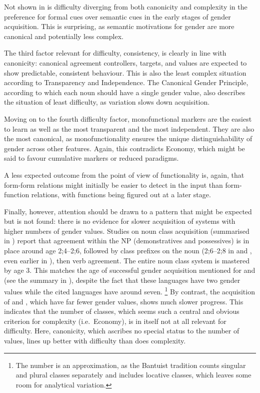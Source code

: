 \documentclass[output=collectionpaper]{langsci/langscibook}
\begin{document}
Not shown in  is difficulty diverging from both canonicity and complexity in the preference for formal cues over semantic cues in the early stages of gender acquisition. This is surprising, as semantic motivations for gender are more canonical and potentially less complex.

The third factor relevant for difficulty, consistency, is clearly in line with canonicity: canonical agreement controllers, targets, and values are expected to show predictable, consistent behaviour. This is also the least complex situation according to Transparency and Independence. The Canonical Gender Principle, according to which each noun should have a single gender value, also describes the situation of least difficulty, as variation slows down acquisition.

Moving on to the fourth difficulty factor, monofunctional markers are the easiest to learn as well as the most transparent and the most independent. They are also the most canonical, as monofunctionality ensures the unique distinguishability of gender across other features. Again, this contradicts Economy, which might be said to favour cumulative markers or reduced paradigms.

A less expected outcome from the point of view of functionality is, again, that form-form relations might initially be easier to detect in the input than form-function relations, with functions being figured out at a later stage.

Finally, however, attention should be drawn to a pattern that might be expected but is not found: there is no evidence for slower acquisition of systems with higher numbers of gender values. Studies on  noun class acquisition (summarised in \citealt{Demuth2003}) report that agreement within the NP (demonstratives and possessives) is in place around age 2;4--2;6, followed by class prefixes on the noun (2;6--2;8 in  and , even earlier in ), then verb agreement. The entire noun class system is mastered by age 3. This matches the age of successful gender acquisition mentioned for  and  (see the summary in \citealt[556]{Eichler2013}), despite the fact that these languages have two gender values while the cited  languages have around seven.%
\footnote{The number is an approximation, as the Bantuist tradition counts singular and plural classes separately and includes locative classes, which leaves some room for analytical variation.} %
By contrast, the acquisition of  and , which have far fewer gender values, shows much slower progress. This indicates that the number of classes, which seems such a central and obvious criterion for complexity (i.e.\ Economy), is in itself not at all relevant for difficulty. Here, canonicity, which ascribes no special status to the number of values, lines up better with difficulty than does complexity.
\end{document}
